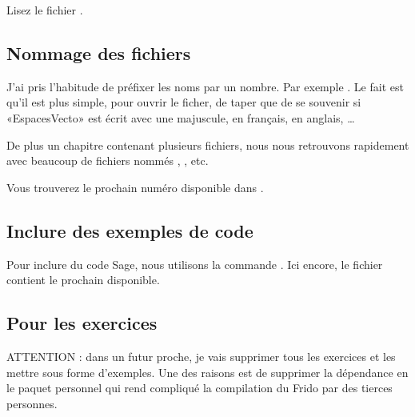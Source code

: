 Lisez le fichier .

\subsection{Nommage des fichiers }

J'ai pris l'habitude de préfixer les noms par un nombre. Par exemple . Le fait est qu'il est plus simple, pour ouvrir le ficher, de taper  que de se souvenir si «EspacesVecto» est écrit avec une majuscule, en français, en anglais, \ldots

De plus un chapitre contenant plusieurs fichiers, nous nous retrouvons rapidement avec beaucoup de fichiers nommés , , etc.

Vous trouverez le prochain numéro disponible dans .

\subsection{Inclure des exemples de code}

Pour inclure du code Sage, nous utilisons la commande . Ici encore, le fichier  contient le prochain disponible.

\subsection{Pour les exercices}

ATTENTION : dans un futur proche, je vais supprimer tous les exercices et les mettre sous forme d'exemples. Une des raisons est de supprimer la dépendance en le paquet personnel  qui rend compliqué la compilation du Frido par des tierces personnes.

